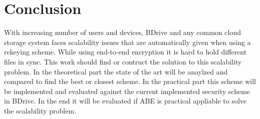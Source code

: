 \documentclass[twocolumn]{article}
\begin{document}



\section{Conclusion}
With increasing number of users and devices, BDrive and any common cloud storage system faces scalability issues that are automatically given when using a rekeying scheme. While using end-to-end encryption it is hard to hold different files in sync. This work should find or contruct the solution to this scalability problem. In the theoretical part the state of the art will be anaylzed and compared to find the best or closest scheme. In the practical part this scheme will be implemented and evaluated against the current implemented security scheme in BDrive. In the end it will be evaluated if ABE is practical appliable to solve the scalability problem.    


 


\end{document}
